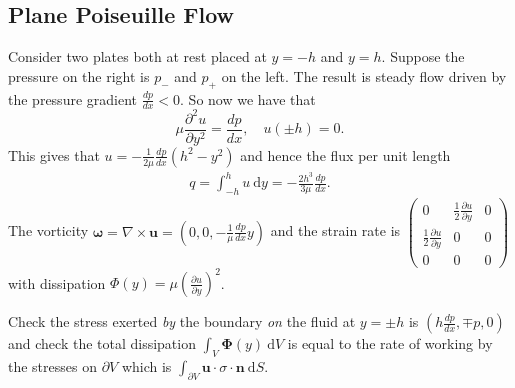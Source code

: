 \documentclass{article}
\begin{document}
\subsection{Plane Poiseuille Flow}
Consider two plates both at rest placed at $ y=-h $ and $ y=h $. Suppose the pressure on the right is $ p_- $ and $ p_+ $ on the left. The result is steady flow driven by the pressure gradient $ \frac{dp}{dx} < 0 $. So now we have that
\[
	\mu \frac{\partial^2 u}{\partial y^2} = \frac{dp}{dx}, \quad u(\pm h) = 0.
\]
This gives that $ u = -\frac 1{2\mu} \frac{dp}{dx}(h^2-y^2) $ and hence the flux per unit length 
\begin{align*}
	q = \int_{-h}^h u\ \mathrm dy = -\frac{2h^3}{3\mu} \frac{dp}{dx}.
\end{align*}
The vorticity $ \boldsymbol\omega = \nabla \times \mathbf u = \left(0,0,-\frac 1\mu \frac{dp}{dx} y\right) $ and the strain rate is $
  \begin{pmatrix}
     0 & \frac 12 \frac{\partial u}{\partial y} & 0 \\
     \frac 12 \frac{\partial u}{\partial y} & 0 & 0 \\
     0 & 0 & 0
\end{pmatrix} $ with dissipation $ \Phi(y) = \mu\left(\frac{\partial u}{\partial y}\right)^2 $.
\begin{remark}
	Check the stress exerted \textit{by} the boundary \textit{on} the fluid at $ y = \pm h $ is $ \left(h \frac{dp}{dx}, \mp p, 0\right) $ and check the total dissipation $ \int_V \boldsymbol \Phi(y)\ \mathrm dV $ is equal to the rate of working by the stresses on $ \partial V $ which is $ \int_{\partial V} \mathbf u \cdot \sigma \cdot \mathbf n \ \mathrm dS $.
\end{remark}
\end{document}
